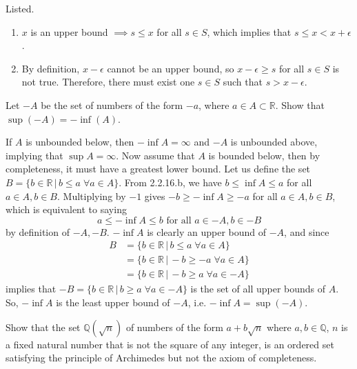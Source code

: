 \documentclass{article}
\begin{document}
    \begin{solution}
    Listed. 
    \begin{enumerate}
        \item $x$ is an upper bound $\implies s \leq x$ for all $s \in S$, which implies that $s \leq x < x + \epsilon$. 
        \item By definition, $x - \epsilon$ cannot be an upper bound, so $x - \epsilon \geq s$ for all $s \in S$ is not true. Therefore, there must exist one $s \in S$ such that $s > x - \epsilon$. 
    \end{enumerate}
    \end{solution}

    \begin{exercise}[Zorich 2.2.18]
    Let $-A$ be the set of numbers of the form $-a$, where $a \in A \subset \mathbb{R}$. Show that $\sup(-A) = -\inf(A)$. 
    \end{exercise}

    \begin{solution}
    If $A$ is unbounded below, then $-\inf{A} = \infty$ and $-A$ is unbounded above, implying that $\sup{A} = \infty$. Now assume that $A$ is bounded below, then by completeness, it must have a greatest lower bound. Let us define the set $B = \{b \in \mathbb{R} \,|\, b \leq a \; \forall a \in A\}$. From 2.2.16.b, we have $b \leq \inf{A} \leq a$ for all $a \in A, b \in B$. Multiplying by $-1$ gives $-b \geq -\inf{A} \geq -a$ for all $a \in A, b \in B$, which is equivalent to saying 
    \[a \leq -\inf{A} \leq b \text{ for all } a \in -A, b \in -B\]
    by definition of $-A, -B$. $-\inf{A}$ is clearly an upper bound of $-A$, and since  
    \begin{align*}
        B & = \{b \in \mathbb{R}\,|\, b \leq a \; \forall a \in A\} \\
        & = \{b \in \mathbb{R}\,|\, -b \geq -a \; \forall a \in A\} \\
        & = \{b \in \mathbb{R}\,|\, -b \geq a \; \forall a \in -A\} 
    \end{align*}
    implies that $-B = \{b \in \mathbb{R}\,|\, b \geq a \; \forall a \in -A\}$ is the set of all upper bounds of $A$. So, $-\inf{A}$ is the least upper bound of $-A$, i.e. $-\inf{A} = \sup(-A)$. 
    \end{solution}

    \begin{exercise}[Zorich 2.2.21]
    Show that the set $\mathbb{Q}(\sqrt{n})$ of numbers of the form $a + b \sqrt{n}$ where $a, b \in \mathbb{Q}$, $n$ is a fixed natural number that is not the square of any integer, is an ordered set satisfying the principle of Archimedes but not the axiom of completeness. 
    \end{exercise}
\end{document}
